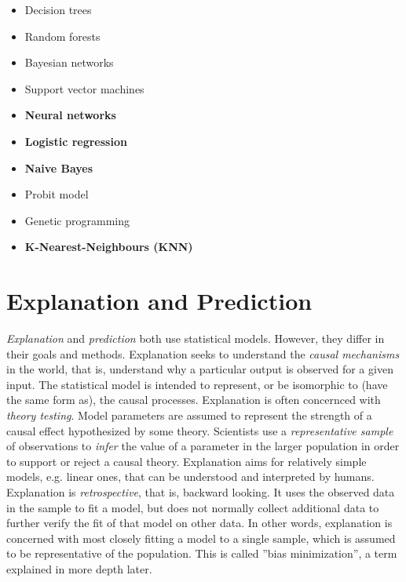 \begin{itemize}
   \item Decision trees
   \item Random forests
   \item Bayesian networks
   \item Support vector machines
   \item \textbf{Neural networks}
   \item \textbf{Logistic regression}
   \item \textbf{Naive Bayes}
   \item Probit model
   \item Genetic programming
   \item \textbf{K-Nearest-Neighbours (KNN)}
\end{itemize}

\section{Explanation and Prediction}

\emph{Explanation} and \emph{prediction} both use statistical models. However, they differ in their goals and methods. Explanation seeks to understand the \emph{causal mechanisms} in the world, that is, understand why a particular output is observed for a given input. The statistical model is intended to represent, or be isomorphic to (have the same form as), the causal processes. Explanation is often concernced with \emph{theory testing}. Model parameters are assumed to represent the strength of a causal effect hypothesized by some theory. Scientists use a \emph{representative sample} of observations to \emph{infer} the value of a parameter in the larger population in order to support or reject a causal theory. Explanation aims for relatively simple models, e.g. linear ones, that can be understood and interpreted by humans. Explanation is \emph{retrospective}, that is, backward looking. It uses the observed data in the sample to fit a model, but does not normally collect additional data to further verify the fit of that model on other data. In other words, explanation is concerned with most closely fitting a model to a single sample, which is assumed to be representative of the population. This is called ''bias minimization'', a term explained in more depth later. 

